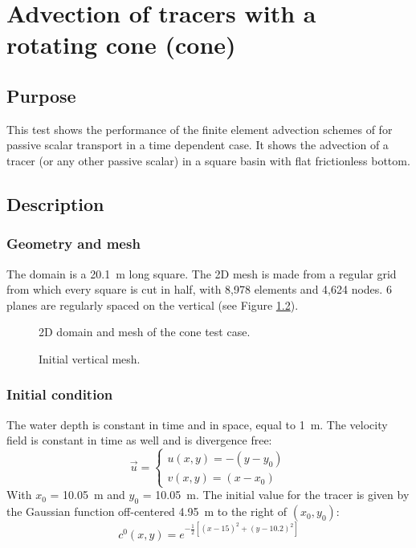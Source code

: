 \chapter{Advection of tracers with a rotating cone (cone)}

\section{Purpose}
This test shows the performance of the finite element advection schemes of
 for passive scalar transport in a time dependent case.
It shows the advection of a tracer (or any other passive scalar)
in a square basin with flat frictionless bottom.

\section{Description}

\subsection{Geometry and mesh}

The domain is a 20.1~m long square.
The 2D mesh is made from a regular grid from which every square is cut in half,
with 8,978 elements and 4,624 nodes.
6 planes are regularly spaced on the vertical (see Figure \ref{t3d:cone:fig:meshV}).

\begin{figure}[h!]
\centering
{}
\caption{2D domain and mesh of the cone test case.}
\label{t3d:cone:mesh}
\end{figure}

\begin{figure}[!htbp]
 \centering
 \caption{Initial vertical mesh.}
 \label{t3d:cone:fig:meshV}
\end{figure}

\subsection{Initial condition}

The water depth is constant in time and in space, equal to 1~m.
The velocity field is constant in time as well and is divergence free:
\begin{equation*}
  \vec{u}=\left\{
         \begin{array}{l}
          u(x,y)=-(y-y_0) \\
          v(x,y)=(x-x_0)
         \end{array}\right.
\end{equation*}
With $x_0$ = 10.05~m and $y_0$ = 10.05~m.
The initial value for the tracer is given by the Gaussian function
off-centered 4.95~m to the right of $(x_0, y_0)$:
\begin{equation*}
c^0(x,y)=e^{-\frac{1}{2}[(x-15)^2+(y-10.2)^2]}
\end{equation*}


